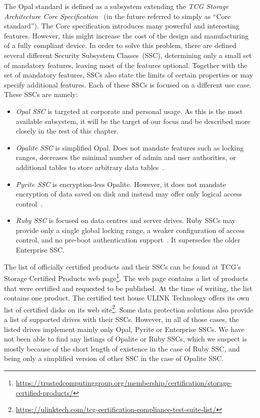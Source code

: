 The Opal standard is defined as a subsystem extending the \emph{TCG Storage Architecture Core Specification}~\cite{tcg-storage-core} (in the future referred to simply as ``Core standard''). 
The Core specification introduces many powerful and interesting features. However, this might increase the cost of the design and manufacturing of a fully compliant device. In order to solve this problem, there are defined several different Security Subsystem Classes~(SSC), determining only a small set of mandatory features, leaving most of the features optional. Together with the set of mandatory features, SSCs also state the limits of certain properties or may specify additional features.
Each of these SSCs is focused on a different use case. These SSCs are namely: \begin{itemize}
    \item \emph{Opal SSC} is targeted at corporate and personal usage. As this is the most available subsystem, it will be the target of our focus and be described more closely in the rest of this chapter.
    \item \emph{Opalite SSC} is simplified Opal. Does not mandate features such as locking ranges, decreases the minimal number of admin and user authorities, or additional tables to store arbitrary data tables~\cite{tcg-opalite}. %
    \item \emph{Pyrite SSC} is encryption-less Opalite. However, it does not mandate encryption of data saved on disk and instead may offer only logical access control~\cite{tcg-pyrite}.
    \item \emph{Ruby SSC} is focused on data centres and server drives. Ruby SSCs may provide only a single global locking range, a weaker configuration of access control, and no pre-boot authentication support~\cite{tcg-ruby}. It supersedes the older Enterprise SSC.
\end{itemize}
The list of officially certified products and their SSCs can be found at TCG's Storage Certified Products web page\footnote{\url{https://trustedcomputinggroup.org/membership/certification/storage-certified-products/}}. The web page contains a list of products that were certified and requested to be published. 
At the time of writing, the list contains one product. The certified test house ULINK Technology offers its own list of certified disks on its web site\footnote{\url{https://ulinktech.com/tcg-certification-compliance-test-suite-list/}}. 
Some data protection solutions also provide a list of supported drives with their SSCs. However, in all of those cases, the listed drives implement mainly only Opal, Pyrite or Enterprise SSCs. We have not been able to find any listings of Opalite or Ruby SSCs, which we suspect is mostly because of the short length of existence in the case of Ruby SSC, and being only a simplified version of other SSC in the case of Opalite SSC.


